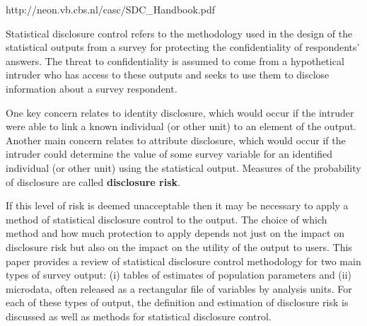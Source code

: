 http://neon.vb.cbs.nl/casc/SDC_Handbook.pdf


Statistical disclosure control refers to the methodology used in the design of the statistical 
outputs from a survey for protecting the confidentiality of respondents’ answers. The 
threat to confidentiality is assumed to come from a hypothetical intruder who has access 
to these outputs and seeks to use them to disclose information about a survey respondent. 


One key concern relates to identity disclosure, which would occur if the intruder were 
able to link a known individual (or other unit) to an element of the output. Another main 
concern relates to attribute disclosure, which would occur if the intruder could determine 
the value of some survey variable for an identified individual (or other unit) using the 
statistical output. Measures of the probability of disclosure are called \textbf{disclosure risk}. 

If 
this level of risk is deemed unacceptable then it may be necessary to apply a method of 
statistical disclosure control to the output. The choice of which method and how much 
protection to apply depends not just on the impact on disclosure risk but also on the 
impact on the utility of the output to users. This paper provides a review of statistical 
disclosure control methodology for two main types of survey output: (i) tables of 
estimates of population parameters and (ii) microdata, often released as a rectangular file 
of variables by analysis units. For each of these types of output, the definition and 
estimation of disclosure risk is discussed as well as methods for statistical disclosure 
control. 

